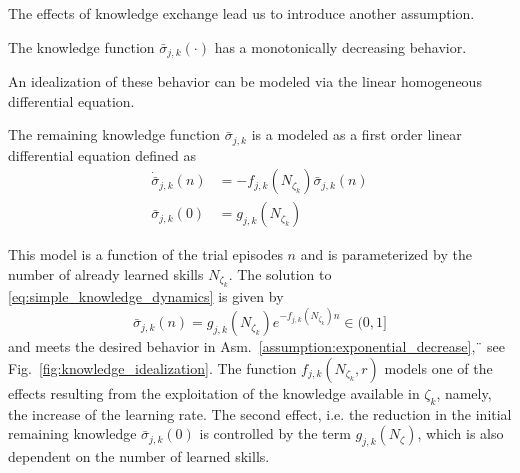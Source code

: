 The effects of knowledge exchange lead us to introduce another assumption.
\begin{tcolorbox}
	\begin{assumption}\label{assumption:exponential_decrease} The knowledge function $\bar{\sigma}_{j,k}(\cdot)$ has a monotonically decreasing behavior.
	\end{assumption}
\end{tcolorbox} 
\noindent

An idealization of these behavior can be modeled via the linear homogeneous differential equation.
\begin{tcolorbox}
	\begin{definition}\label{assumption:ode_model}
		The remaining knowledge function $\bar{\sigma}_{j,k}$ is a modeled as a first order linear differential equation defined as
		\begin{subequations}\label{eq:simple_knowledge_dynamics}
			\begin{alignat}{2}
				\dot{\bar{\sigma}}_{j,k}\left(n\right) &= -f_{j,k} \left(N_{\zeta_k} \right) \bar{\sigma}_{j,k}\left(n\right)\\
				\bar{\sigma}_{j,k}(0) &= g_{j,k} \left(N_{\zeta_k}\right)
			\end{alignat}
		\end{subequations}
	\end{definition}
\end{tcolorbox} 
This model is a function of the trial episodes $n$ and is parameterized by the number of already learned skills $N_{\zeta_k}$. The solution to \eqref{eq:simple_knowledge_dynamics} is given by
\begin{equation}\label{eq:knowledge_exponential_form}
	\boxed{\bar{\sigma}_{j,k}(n) = g_{j,k}\left(N_{\zeta_k}\right) e ^{-f_{j,k}\left(N_{\zeta_k}\right) n} \in (0,1]}
\end{equation}
and meets the desired behavior in Asm.~\ref{assumption:exponential_decrease},¨ see Fig.~\ref{fig:knowledge_idealization}. The function $f_{j,k}\left(N_{\zeta_k}, r\right)$ models one of the effects resulting from the exploitation of the knowledge available in $\zeta_k$, namely, the increase of the learning rate. The second effect, i.e. the reduction in the initial remaining knowledge $\bar{\sigma}_{j,k}(0)$ is controlled by the term $g_{j,k}\left(N_{\zeta}\right)$, which is also dependent on the number of learned skills.
